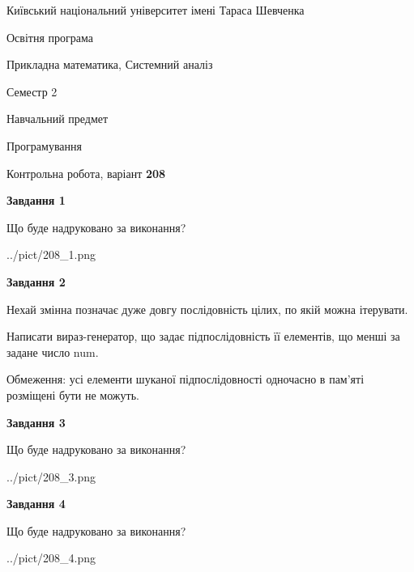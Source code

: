 \documentclass[12pt, ukrainian]{article}
\begin{document}
{{\begin {small}\par
{ \center  Київський національний університет імені Тараса Шевченка \par}
{\parbox {5 cm}{Освітня програма \hfill}{\parbox {8 cm}{Прикладна математика, Системний аналіз \hfill}}\parbox {5 cm}{\hfill Семестр 2}}\par
{\parbox {5 cm} {Навчальний предмет \hfill}\parbox {7 cm}{Програмування \hfill}\parbox {6cm}{\hfill}\par}\vspace{-7pt} \end{small}}{\center Контрольна робота, варіант  \No \textbf
{ 208 }\par}}
{
\begin {large}
{\begin {center}\textbf{Завдання 1}\end {center}}\par
Що буде надруковано за виконання?\par\par
\begin{center}
	{../pict/208_1.png}
\end{center}
\newpage

{\begin {center}\textbf{Завдання 2}\end {center}}\par
Нехай змінна  позначає дуже довгу послідовність цілих, по якій можна ітерувати.

Написати вираз-генератор, що задає підпослідовність її елементів, що менші за задане число num.

Обмеження: усі елементи шуканої підпослідовності одночасно в пам'яті розміщені бути не можуть.\par
\newpage

{\begin {center}\textbf{Завдання 3}\end {center}}\par
Що буде надруковано за виконання?\par
\begin{center}
	{../pict/208_3.png}
\end{center}
\newpage

{\begin {center}\textbf{Завдання 4}\end {center}}\par
Що буде надруковано за виконання?\par
\begin{center}
	{../pict/208_4.png}
\end{center}
\newpage


\end{large}}
\end{document}
